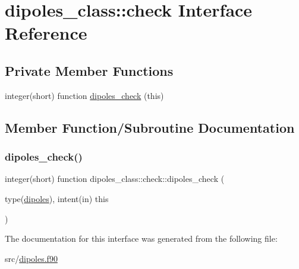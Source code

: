 \hypertarget{interfacedipoles__class_1_1check}{}\section{dipoles\+\_\+class\+:\+:check Interface Reference}
\label{interfacedipoles__class_1_1check}
\subsection*{Private Member Functions}
\begin{DoxyCompactItemize}
\item 
integer(short) function \hyperlink{interfacedipoles__class_1_1check_a1afd058d4265177ebf90bf98c6811d09}{dipoles\+\_\+check} (this)
\end{DoxyCompactItemize}


\subsection{Member Function/\+Subroutine Documentation}
\mbox{\label{interfacedipoles__class_1_1check_a1afd058d4265177ebf90bf98c6811d09}} 
\subsubsection{\texorpdfstring{dipoles\+\_\+check()}{dipoles\_check()}}
{\footnotesize\ttfamily integer(short) function dipoles\+\_\+class\+::check\+::dipoles\+\_\+check (\begin{DoxyParamCaption}\item[{type(\hyperlink{structdipoles__class_1_1dipoles}{dipoles}), intent(in)}]{this }\end{DoxyParamCaption})\hspace{0.3cm}{\ttfamily [private]}}



The documentation for this interface was generated from the following file\+:\begin{DoxyCompactItemize}
\item 
src/\hyperlink{dipoles_8f90}{dipoles.\+f90}\end{DoxyCompactItemize}
